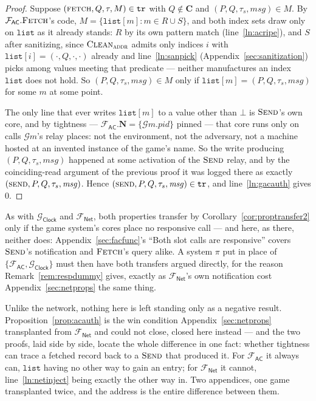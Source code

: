 \documentclass[11pt,a4paper]{article}
\newcommand{\PID}{\mathit{pid}}
\newcommand{\admits}{\mathbf{N}}
\newcommand{\Cs}{\mathbf{C}}
\newcommand{\op}[1]{\textsc{#1}}
\newcommand{\Gm}{\mathcal{G}m}
\newcommand{\Gclock}{\mathcal{G}_{\mathsf{Clock}}}
\newcommand{\Fnet}{\mathcal{F}_{\mathsf{Net}}}
\newcommand{\Fac}{\mathcal{F}_{\mathsf{AC}}}
\newcommand{\msg}{\mathit{msg}}
\newcommand{\none}{\bot}
\newcommand{\Clean}{\op{Clean}}
\newcommand{\V}[1]{\mathtt{#1}}
\theoremstyle{accentdef}
\theoremstyle{accentplain}
\begin{document}
\begin{proof}
Suppose $(\op{fetch},Q,\tau,M) \in \V{tr}$ with $Q \notin \Cs$ and $(P,Q,\tau_s,\msg) \in M$. By
$\Fac.\op{Fetch}$'s code, $M = \{\V{list}[m] : m \in R \cup S\}$, and both index sets draw only on
$\V{list}$ as it already stands: $R$ by its own pattern match (line~\ref{ln:acripe}), and $S$ after
sanitizing, since $\Clean_{\op{addr}}$ admits only indices $i$ with
$\V{list}[i] = (\cdot,Q,\cdot,\cdot)$ already and line~\ref{ln:sanpick}
(Appendix~\ref{sec:sanitization}) picks among values meeting that predicate --- neither
manufactures an index $\V{list}$ does not hold. So $(P,Q,\tau_s,\msg) \in M$ only if
$\V{list}[m] = (P,Q,\tau_s,\msg)$ for some $m$ at some point.

The only line that ever writes $\V{list}[m]$ to a value other than $\none$ is $\op{Send}$'s own
core, and by tightness --- $\Fac.\admits = \{\Gm.\PID\}$ pinned --- that core runs only on calls
$\Gm$'s relay places: not the environment, not the adversary, not a machine hosted at an invented
instance of the game's name. So the write producing $(P,Q,\tau_s,\msg)$ happened at some
activation of the $\op{Send}$ relay, and by the coinciding-read argument of the previous proof it
was logged there as exactly $(\op{send},P,Q,\tau_s,\msg)$. Hence
$(\op{send},P,Q,\tau_s,\msg) \in \V{tr}$, and line~\ref{ln:gacauth} gives $0$.
\end{proof}

As with $\Gclock$ and $\Fnet$, both properties transfer by Corollary~\ref{cor:proptransfer2} only
if the game system's cores place no responsive call --- and here, as there, neither does:
Appendix~\ref{sec:facfunc}'s ``Both slot calls are responsive'' covers $\op{Send}$'s notification
and $\op{Fetch}$'s query alike. A system $\pi$ put in place of $\{\Fac,\Gclock\}$ must then have
both transfers argued directly, for the reason Remark~\ref{rem:respdummy} gives, exactly as
$\Fnet$'s own notification cost Appendix~\ref{sec:netprops} the same thing.

Unlike the network, nothing here is left standing only as a negative result.
Proposition~\ref{prop:acauth} is the win condition Appendix~\ref{sec:netprops} transplanted from
$\Fnet$ and could not close, closed here instead --- and the two proofs, laid side by side, locate
the whole difference in one fact: whether tightness can trace a fetched record back to a
$\op{Send}$ that produced it. For $\Fac$ it always can, $\V{list}$ having no other way to gain an
entry; for $\Fnet$ it cannot, line~\ref{ln:netinject} being exactly the other way in. Two
appendices, one game transplanted twice, and the address is the entire difference between them.
\end{document}

